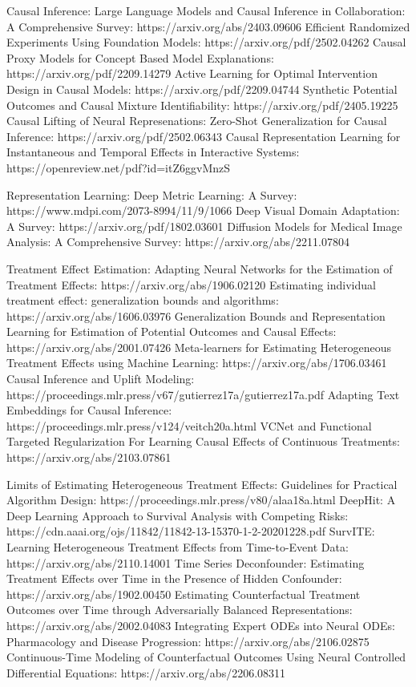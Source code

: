 Causal Inference: 
Large Language Models and Causal Inference in Collaboration: A Comprehensive Survey: https://arxiv.org/abs/2403.09606
Efficient Randomized Experiments Using Foundation Models: https://arxiv.org/pdf/2502.04262
Causal Proxy Models for Concept Based Model Explanations: https://arxiv.org/pdf/2209.14279
Active Learning for Optimal Intervention Design in Causal Models: https://arxiv.org/pdf/2209.04744
Synthetic Potential Outcomes and Causal Mixture Identifiability: https://arxiv.org/pdf/2405.19225
Causal Lifting of Neural Represenations: Zero-Shot Generalization for Causal Inference: https://arxiv.org/pdf/2502.06343
Causal Representation Learning for Instantaneous and Temporal Effects in Interactive Systems: https://openreview.net/pdf?id=itZ6ggvMnzS

Representation Learning:
Deep Metric Learning: A Survey: https://www.mdpi.com/2073-8994/11/9/1066
Deep Visual Domain Adaptation: A Survey: https://arxiv.org/pdf/1802.03601
Diffusion Models for Medical Image Analysis: A Comprehensive Survey: https://arxiv.org/abs/2211.07804

Treatment Effect Estimation:
Adapting Neural Networks for the Estimation of Treatment Effects: https://arxiv.org/abs/1906.02120
Estimating individual treatment effect: generalization bounds and algorithms: https://arxiv.org/abs/1606.03976
Generalization Bounds and Representation Learning for Estimation of Potential Outcomes and Causal Effects: https://arxiv.org/abs/2001.07426
Meta-learners for Estimating Heterogeneous Treatment Effects using Machine Learning: https://arxiv.org/abs/1706.03461
Causal Inference and Uplift Modeling: https://proceedings.mlr.press/v67/gutierrez17a/gutierrez17a.pdf
Adapting Text Embeddings for Causal Inference: https://proceedings.mlr.press/v124/veitch20a.html
VCNet and Functional Targeted Regularization For Learning Causal Effects of Continuous Treatments: https://arxiv.org/abs/2103.07861

Limits of Estimating Heterogeneous Treatment Effects: Guidelines for Practical Algorithm Design: https://proceedings.mlr.press/v80/alaa18a.html
DeepHit: A Deep Learning Approach to Survival Analysis with Competing Risks: https://cdn.aaai.org/ojs/11842/11842-13-15370-1-2-20201228.pdf
SurvITE: Learning Heterogeneous Treatment Effects from Time-to-Event Data:  https://arxiv.org/abs/2110.14001
Time Series Deconfounder: Estimating Treatment Effects over Time in the Presence of Hidden Confounder: https://arxiv.org/abs/1902.00450
Estimating Counterfactual Treatment Outcomes over Time through Adversarially Balanced Representations: https://arxiv.org/abs/2002.04083
Integrating Expert ODEs into Neural ODEs: Pharmacology and Disease Progression: https://arxiv.org/abs/2106.02875
Continuous-Time Modeling of Counterfactual Outcomes Using Neural Controlled Differential Equations: https://arxiv.org/abs/2206.08311

